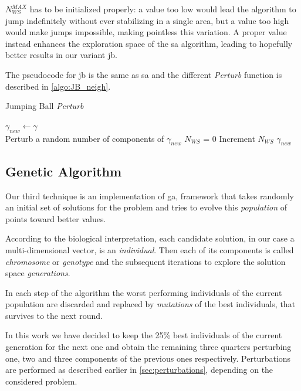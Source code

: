 \documentclass[12pt,journal,draftclsnofoot,onecolumn]{IEEEtran}
\begin{document}
$N_{WS}^{MAX}$ has to be initialized properly: a value too low would lead the algorithm to jump indefinitely without ever stabilizing in a single area, but a value too high would make jumps impossible, making pointless this variation.
A proper value instead enhances the exploration space of the \gls{sa} algorithm, leading to hopefully better results in our variant \gls{jb}.

The pseudocode for \gls{jb} is the same as \gls{sa} and the different \emph{Perturb} function is described in \autoref{algo:JB_neigh}.

\begin{algorithm}
	\caption{Jumping Ball \emph{Perturb}}\label{algo:JB_neigh}
	 {
		$\gamma_{new} \gets \gamma$ \\
		 {
			 {
				Perturb a random number of components of $\gamma_{new}$
			}
			$N_{WS}$ = 0
		}
	}
	 {
		Increment $N_{WS}$
	}
	\Return $\gamma_{new}$
\end{algorithm}

\clearpage
\subsection{Genetic Algorithm}

Our third technique is an implementation of \gls{ga}, framework that takes randomly an initial set of solutions for the problem and tries to evolve this \emph{population} of points toward better values.

According to the biological interpretation, each candidate solution, in our case a multi-dimensional vector, is an \emph{individual}.
Then each of its components is called \emph{chromosome} or \emph{genotype} and the subsequent iterations to explore the solution space \emph{generations}.

In each step of the algorithm the worst performing individuals of the current population are discarded and replaced by \emph{mutations} of the best individuals, that survives to the next round.

In this work we have decided to keep the 25\% best individuals of the current generation for the next one and obtain the remaining three quarters perturbing one, two and three components of the previous ones respectively. Perturbations are performed as described earlier in \autoref{sec:perturbations}, depending on the considered problem.
\end{document}
